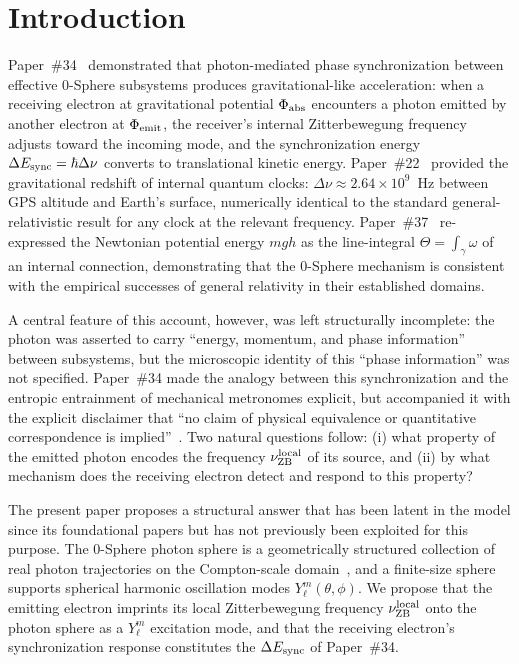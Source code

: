 \documentclass[%
 reprint, amsmath,amssymb, aps, prb, ]{revtex4-2}
\numberwithin{equation}{section}
\newcommand{\nuZBl}{\nu_{\text{ZB}}^{\rm local}}
\begin{document}
\maketitle

\section{Introduction}
\label{sec:introduction}

Paper~\#34~\cite{hanamura34} demonstrated that photon-mediated phase synchronization between effective 0-Sphere subsystems produces gravitational-like acceleration: when a receiving electron at gravitational potential $\Phi_{\rm abs}$ encounters a photon emitted by another electron at $\Phi_{\rm emit}$, the receiver's internal Zitterbewegung frequency~\cite{schrodinger1930} adjusts toward the incoming mode, and the synchronization energy $\Delta E_{\rm sync} = \hbar\Delta\nu$ converts to translational kinetic energy. Paper~\#22~\cite{hanamura22} provided the gravitational redshift of internal quantum clocks: $\Delta\nu \approx 2.64\times 10^9$~Hz between GPS altitude and Earth's surface, numerically identical to the standard general-relativistic result for any clock at the relevant frequency. Paper~\#37~\cite{hanamura37} re-expressed the Newtonian potential energy $mgh$ as the line-integral $\Theta = \int_\gamma \omega$ of an internal connection, demonstrating that the 0-Sphere mechanism is consistent with the empirical successes of general relativity in their established domains.

A central feature of this account, however, was left structurally incomplete: the photon was asserted to carry ``energy, momentum, and phase information'' between subsystems, but the microscopic identity of this ``phase information'' was not specified. Paper~\#34 made the analogy between this synchronization and the entropic entrainment of mechanical metronomes explicit, but accompanied it with the explicit disclaimer that ``no claim of physical equivalence or quantitative correspondence is implied''~\cite{hanamura34}. Two natural questions follow: (i) what property of the emitted photon encodes the frequency $\nuZBl$ of its source, and (ii) by what mechanism does the receiving electron detect and respond to this property?

The present paper proposes a structural answer that has been latent in the model since its foundational papers but has not previously been exploited for this purpose. The 0-Sphere photon sphere is a geometrically structured collection of real photon trajectories on the Compton-scale domain~\cite{hanamura01,hanamura34}, and a finite-size sphere supports spherical harmonic oscillation modes $Y_\ell^m(\theta,\phi)$. We propose that the emitting electron imprints its local Zitterbewegung frequency $\nuZBl$ onto the photon sphere as a $Y_\ell^m$ excitation mode, and that the receiving electron's synchronization response constitutes the $\Delta E_{\rm sync}$ of Paper~\#34.
\end{document}
